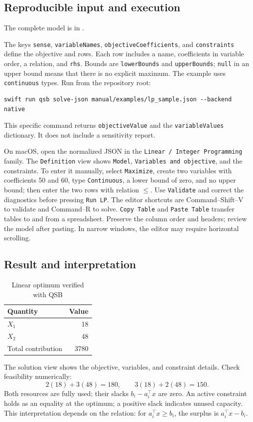 \subsection{Reproducible input and execution}
The complete model is in .
\par\noindent The keys
\texttt{sense}, \texttt{variableNames}, \texttt{objectiveCoefficients}, and
\texttt{constraints} define the objective and rows. Each row includes a name,
coefficients in variable order, a relation, and \texttt{rhs}. Bounds are
\texttt{lowerBounds} and \texttt{upperBounds}; \texttt{null} in an upper bound
means that there is no explicit maximum. The example uses
\texttt{continuous} types. Run from the repository root:
\begin{lstlisting}
swift run qsb solve-json manual/examples/lp_sample.json --backend native
\end{lstlisting}
This specific command returns \texttt{objectiveValue} and the
\texttt{variableValues} dictionary. It does not include a sensitivity report.

On macOS, open the normalized JSON in the
\texttt{Linear / Integer Programming} family. The \texttt{Definition} view
shows \texttt{Model}, \texttt{Variables and objective}, and the constraints.
To enter it manually, select \texttt{Maximize}, create two variables with
coefficients 50 and 60, type \texttt{Continuous}, a lower bound of zero, and no
upper bound; then enter the two rows with relation \(\leq\). Use
\texttt{Validate} and correct the diagnostics before pressing \texttt{Run LP}.
The editor shortcuts are Command--Shift--V to validate and Command--R to
solve. \texttt{Copy Table} and \texttt{Paste Table} transfer tables to and from
a spreadsheet. Preserve the column order and headers;
review the model after pasting. In narrow windows, the editor may require
horizontal scrolling.

\subsection{Result and interpretation}
\begin{table}[htbp]
\centering
\caption{Linear optimum verified with QSB}
\begin{tabular}{lr}
\toprule
Quantity & Value \\
\midrule
\(X_1\) & 18 \\
\(X_2\) & 48 \\
Total contribution & 3780 \\
\bottomrule
\end{tabular}
\end{table}
The solution view shows the objective, variables, and constraint details.
Check feasibility numerically:
\[
 2(18)+3(48)=180,\qquad3(18)+2(48)=150.
\]
Both resources are fully used; their slacks \(b_i-a_i^\top x\) are zero.
An active constraint holds as an equality at the optimum; a positive slack
indicates unused capacity. This interpretation depends on the relation:
for \(a_i^\top x\geq b_i\), the surplus is \(a_i^\top x-b_i\).

